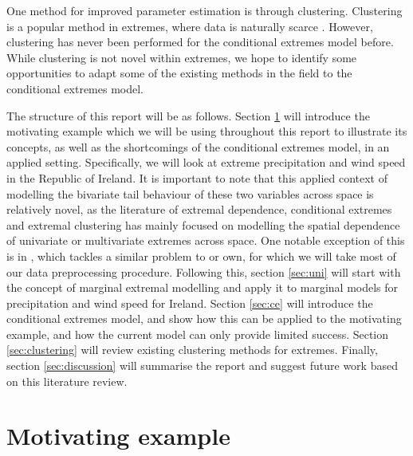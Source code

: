 \documentclass{article}
\numberwithin{equation}{section}
\begin{document}
One method for improved parameter estimation is through clustering.
Clustering is a popular method in extremes, where data is naturally scarce \citep{Ferreira2023-mz, Zheng2023-jf}.
However, clustering has never been performed for the conditional extremes model before. 
While clustering is not novel within extremes, we hope to identify some opportunities to adapt some of the existing methods in the field to the conditional extremes model.

The structure of this report will be as follows.
Section \ref{sec:motivating} will introduce the motivating example which we will be using throughout this report to illustrate its concepts, as well as the shortcomings of the conditional extremes model, in an applied setting.
Specifically, we will look at extreme precipitation and wind speed in the Republic of Ireland. 
It is important to note that this applied context of modelling the bivariate tail behaviour of these two variables across space is relatively novel, as the literature of extremal dependence, conditional extremes and extremal clustering has mainly focused on modelling the spatial dependence of univariate or multivariate extremes across space. 
One notable exception of this is in \citet{Vignotto2021}, which tackles a similar problem to or own, for which we will take most of our data preprocessing procedure. 
Following this, section \ref{sec:uni} will start with the concept of marginal extremal modelling and apply it to marginal models for precipitation and wind speed for Ireland.
Section \ref{sec:ce} will introduce the conditional extremes model, and show how this can be applied to the motivating example, and how the current model can only provide limited success.
Section \ref{sec:clustering} will review existing clustering methods for extremes.
Finally, section \ref{sec:discussion} will summarise the report and suggest future work based on this literature review.

\newpage
\section{Motivating example} \label{sec:motivating}
\end{document}
